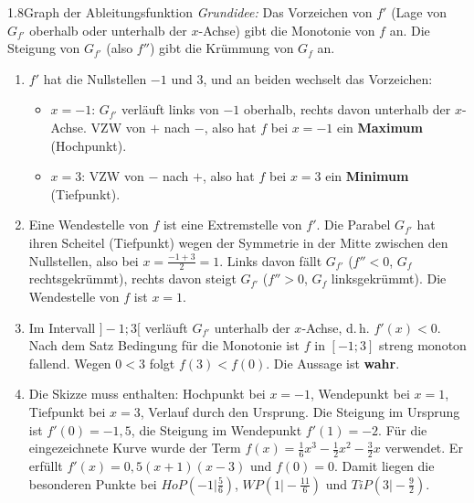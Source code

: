 \begin{loesung}{1.8}{Graph der Ableitungsfunktion}
\textit{Grundidee:} Das Vorzeichen von $f'$ (Lage von $G_{f'}$ oberhalb oder unterhalb der $x$-Achse) gibt die Monotonie von $f$ an. Die Steigung von $G_{f'}$ (also $f''$) gibt die Krümmung von $G_f$ an.
\begin{enumerate}[label=\alph*)]
  \item $f'$ hat die Nullstellen $-1$ und $3$, und an beiden wechselt das Vorzeichen:
  \begin{itemize}
    \item $x=-1$: $G_{f'}$ verläuft links von $-1$ oberhalb, rechts davon unterhalb der $x$-Achse. VZW von $+$ nach $-$, also hat $f$ bei $x=-1$ ein \textbf{Maximum} (Hochpunkt).
    \item $x=3$: VZW von $-$ nach $+$, also hat $f$ bei $x=3$ ein \textbf{Minimum} (Tiefpunkt).
  \end{itemize}
  \item Eine Wendestelle von $f$ ist eine Extremstelle von $f'$. Die Parabel $G_{f'}$ hat ihren Scheitel (Tiefpunkt) wegen der Symmetrie in der Mitte zwischen den Nullstellen, also bei $x=\frac{-1+3}{2}=1$. Links davon fällt $G_{f'}$ ($f''<0$, $G_f$ rechtsgekrümmt), rechts davon steigt $G_{f'}$ ($f''>0$, $G_f$ linksgekrümmt). Die Wendestelle von $f$ ist $x=1$.
  \item Im Intervall $]-1;3[$ verläuft $G_{f'}$ unterhalb der $x$-Achse, d.\,h. $f'(x)<0$. Nach dem Satz \glqq Bedingung für die Monotonie\grqq{} ist $f$ in $[-1;3]$ streng monoton fallend. Wegen $0<3$ folgt $f(3)<f(0)$. Die Aussage ist \textbf{wahr}.
  \item Die Skizze muss enthalten: Hochpunkt bei $x=-1$, Wendepunkt bei $x=1$, Tiefpunkt bei $x=3$, Verlauf durch den Ursprung. Die Steigung im Ursprung ist $f'(0)=-1{,}5$, die Steigung im Wendepunkt $f'(1)=-2$. Für die eingezeichnete Kurve wurde der Term $f(x) = \frac{1}{6}x^3-\frac{1}{2}x^2-\frac{3}{2}x$ verwendet. Er erfüllt $f'(x)=0{,}5(x+1)(x-3)$ und $f(0)=0$. Damit liegen die besonderen Punkte bei $HoP\left(-1\big|\frac{5}{6}\right)$, $WP\left(1\big|-\frac{11}{6}\right)$ und $TiP\left(3\big|-\frac{9}{2}\right)$.
  \begin{center}
  \end{center}
\end{enumerate}
\end{loesung}

